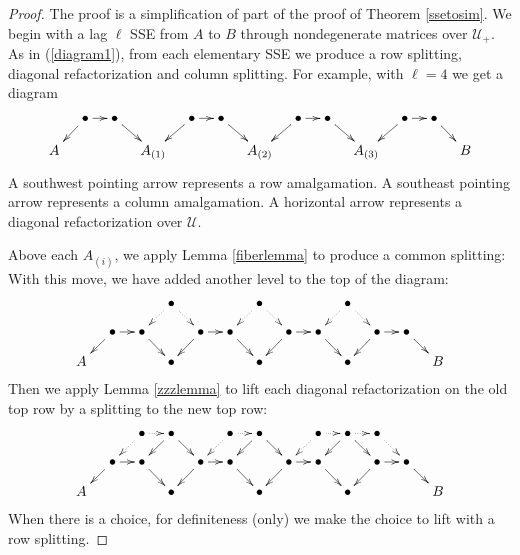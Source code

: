 \documentclass{amsart}
\theoremstyle{definition}
\theoremstyle{remark}
\numberwithin{equation}{section}
\begin{document}
{{\begin{proof}
The proof is a simplification of part of the proof of 
Theorem \ref{ssetosim}. We begin with a lag $\ell$  SSE from $A$ to $B$ 
through nondegenerate matrices over $\mathcal U_+$. As in 
(\ref{diagram1}), from each  elementary SSE we produce 
 a row splitting, diagonal refactorization and column splitting. 
For example, with $\ell = 4$ we get a diagram 
\begin{equation}
\xymatrix@=10pt{
    & \bullet  \ar[r]\ar[dl] & \bullet \ar[dr] &    &\bullet   \ar[r]\ar[dl] & \bullet  \ar[dr] &    & \bullet  \ar[r]\ar[dl]
 & \bullet  \ar[dr] &   & \bullet \ar[r]\ar[dl] & \bullet  \ar[dr] &      \\
A &    &  &A_{(1)}  &    &   &A_{(2)}   &  &  &A_{(3)}  &  &  & B                                         
}
\end{equation} 
A southwest pointing arrow  represents a row amalgamation. 
A southeast pointing arrow  represents a column amalgamation. 
A horizontal arrow represents a diagonal refactorization over $\mathcal U$. 

Above each $A_{(i)}$, 
we apply Lemma \ref{fiberlemma} to produce a common splitting: 
With this move, we have added another level to the top of the diagram: 
\begin{equation}
\xymatrix@=10pt{
 &&    & \bullet\ar@{.>}[dl]\ar@{.>}[dr] & & &\bullet\ar@{.>}[dl]\ar@{.>}[dr] &  &  &\bullet\ar@{.>}[dl]\ar@{.>}[dr]    &  &  &  \\
    & \bullet  \ar[r]\ar[dl] & \bullet \ar[dr] &    &\bullet   \ar[r]\ar[dl] & \bullet  \ar[dr] &    & \bullet  \ar[r]\ar[dl]
 & \bullet  \ar[dr] &   & \bullet \ar[r]\ar[dl] & \bullet  \ar[dr] &      \\
A &  &  &  \bullet &  &   &  \bullet  &  &  & \bullet  &  &   & B                                         
}
\end{equation}
Then we apply
Lemma \ref{zzzlemma}
to lift each diagonal refactorization on the old 
top row by a splitting to the new top row: 
\begin{equation}
\xymatrix@=10pt{
 & &\bullet\ar@{.>}[dl]\ar@{.>}[r] & \bullet\ar[dl]\ar[dr] &  &\bullet\ar@{.>}[dl]\ar@{.>}[r] &\bullet\ar[dl]\ar[dr]
 &  &\bullet\ar@{.>}[dl]\ar@{.>}[r]  &\bullet\ar[dl]\ar[dr]\ar@{.>}[r]    & \bullet \ar@{.>}[dr]&    \\
    & \bullet  \ar[r]\ar[dl] & \bullet \ar[dr] &    &\bullet   \ar[r]\ar[dl] & \bullet  \ar[dr] &    & \bullet  \ar[r]\ar[dl]
 & \bullet  \ar[dr] &   & \bullet \ar[r]\ar[dl] & \bullet  \ar[dr] &      \\
A &  &  &  \bullet &  &   &  \bullet  &  &  & \bullet  &  &   & B                                         
}
\end{equation}
When there is a choice, for definiteness (only) we make the choice to lift with a 
row splitting.  


\end{proof}}}
\end{document}
